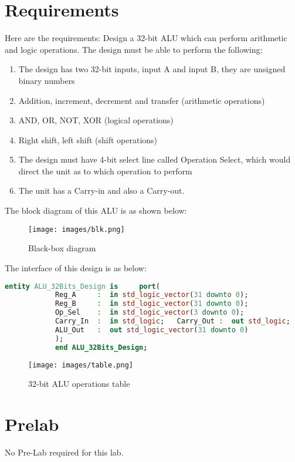 \documentclass[notitlepage,a4paper,oneside,article,table]{article}
\begin{document}
\section{Requirements}
Here are the requirements: Design a 32-bit ALU which can perform arithmetic and logic operations. The design must be able to perform the following: 
\begin{enumerate}
    \item The design has two 32-bit inputs, input A and input B, they are unsigned binary numbers
    \item Addition, increment, decrement and transfer (arithmetic operations) 
    \item AND, OR, NOT, XOR (logical operations) 
    \item Right shift, left shift (shift operations) 
    \item The design must have 4-bit select line called Operation Select, which would direct the unit as to which operation to perform 
    \item The unit has a Carry-in and also a Carry-out. 
\end{enumerate}
The block diagram of this ALU is as shown below: 
\begin{figure}[h] %
    \centering
    \texttt{[image: images/blk.png]}
    \caption{Black-box diagram}
\end{figure}
\FloatBarrier
 
The interface of this design is as below: 

\lstset{style=mystyle}
\begin{lstlisting}[language=VHDL, caption=I/O stream]
            entity ALU_32Bits_Design is  	port( 
            Reg_A     :  in std_logic_vector(31 downto 0); 
            Reg_B     :  in std_logic_vector(31 downto 0); 
            Op_Sel    :  in std_logic_vector(3 downto 0); 
            Carry_In  :  in std_logic;   Carry_Out :  out std_logic; 
            ALU_Out   :  out std_logic_vector(31 downto 0) 
            ); 
            end ALU_32Bits_Design; 
\end{lstlisting}

\begin{figure}[h] %
    \centering
    \texttt{[image: images/table.png]}
    \caption{32-bit ALU operations table}
\end{figure}
\FloatBarrier


\section{Prelab}
No Pre-Lab required for this lab.
\end{document}
